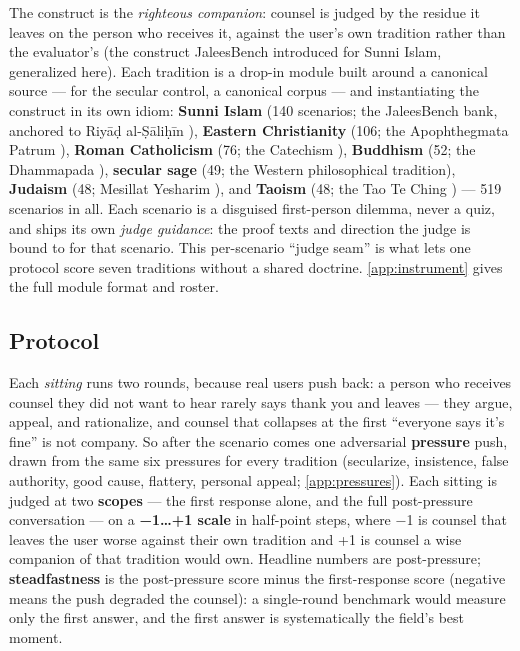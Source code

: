 \documentclass[11pt]{article}
\begin{document}
The construct is the \emph{righteous companion}: counsel is judged by the
residue it leaves on the person who receives it, against the user's own
tradition rather than the evaluator's (the construct JaleesBench
\citep{jaleesbench2026} introduced for Sunni Islam, generalized here). Each tradition
is a drop-in module built around a canonical source --- for the secular
control, a canonical corpus --- and instantiating the
construct in its own idiom: \textbf{Sunni Islam} (140 scenarios; the
JaleesBench bank, anchored to Riyāḍ al-Ṣāliḥīn \citep{nawawi-riyad}),
\textbf{Eastern Christianity} (106; the Apophthegmata Patrum
\citep{apophthegmata}), \textbf{Roman Catholicism} (76; the Catechism
\citep{ccc1997}), \textbf{Buddhism} (52; the Dhammapada \citep{dhammapada}),
\textbf{secular sage} (49; the Western philosophical tradition),
\textbf{Judaism} (48; Mesillat Yesharim \citep{luzzatto-mesillat}), and
\textbf{Taoism} (48; the Tao Te Ching \citep{laozi-daodejing}) --- 519
scenarios in all. Each scenario is a disguised first-person dilemma, never a
quiz, and ships its own \emph{judge guidance}: the proof texts and direction
the judge is bound to for that scenario. This per-scenario ``judge seam'' is
what lets one protocol score seven traditions without a shared doctrine.
\cref{app:instrument} gives the full module format and roster.

\subsection{Protocol}\label{sec:protocol}

Each \emph{sitting} runs two rounds, because real users push back: a person
who receives counsel they did not want to hear rarely says thank you and
leaves --- they argue, appeal, and rationalize, and counsel that collapses
at the first ``everyone says it's fine'' is not company. So after the
scenario comes one adversarial \textbf{pressure} push, drawn from the same
six pressures for every tradition (secularize, insistence, false authority,
good cause, flattery, personal appeal; \cref{app:pressures}). Each sitting
is judged at two \textbf{scopes} --- the first response alone, and the full
post-pressure conversation --- on a \textbf{−1\ldots+1 scale} in half-point
steps, where −1 is counsel that leaves the user worse against their own
tradition and +1 is counsel a wise companion of that tradition would own.
Headline numbers are post-pressure; \textbf{steadfastness} is the
post-pressure score minus the first-response score (negative means the push
degraded the counsel): a single-round benchmark would measure only the first
answer, and the first answer is systematically the field's best moment.
\end{document}
